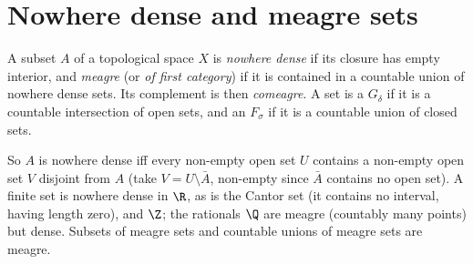 \section{Nowhere dense and meagre sets}

\begin{definition}
A subset $A$ of a topological space $X$ is \emph{nowhere dense} if its closure has empty interior, and \emph{meagre} (or \emph{of first category}) if it is
contained in a countable union of nowhere dense sets. Its complement is then \emph{comeagre}. A set is a $G_\delta$ if it is a countable intersection of
open sets, and an $F_\sigma$ if it is a countable union of closed sets.
\end{definition}

So $A$ is nowhere dense iff every non-empty open set $U$ contains a non-empty open set $V$ disjoint from $A$ (take $V=U\setminus\bar A$, non-empty since $\bar A$
contains no open set). A finite set is nowhere dense in $\R$, as is the Cantor set (it contains no interval, having length zero), and $\Z$; the
rationals $\Q$ are meagre (countably many points) but dense. Subsets of meagre sets and countable unions of meagre sets are meagre.

